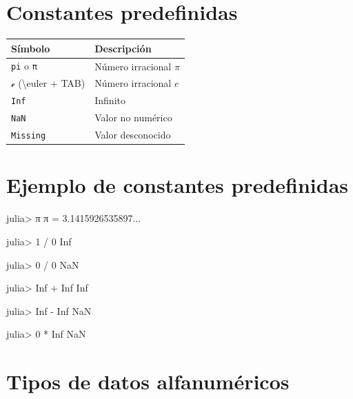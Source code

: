 \documentclass[
  letterpaper,
  DIV=11,
  numbers=noendperiod]{scrreprt}
\newenvironment{Shaded}{\begin{snugshade}}{\end{snugshade}}
\newcommand{\ConstantTok}[1]{\textcolor[rgb]{0.56,0.35,0.01}{#1}}
\newcommand{\FloatTok}[1]{\textcolor[rgb]{0.68,0.00,0.00}{#1}}
\newcommand{\NormalTok}[1]{\textcolor[rgb]{0.00,0.23,0.31}{#1}}
\newcommand{\OperatorTok}[1]{\textcolor[rgb]{0.37,0.37,0.37}{#1}}
\begin{document}
\hypertarget{constantes-predefinidas}{%
\section{Constantes predefinidas}\label{constantes-predefinidas}}

\begin{longtable}[]{@{}ll@{}}
\toprule()
Símbolo & Descripción \\
\midrule()
\endhead
\texttt{pi} o \texttt{π} & Número irracional \(\pi\) \\
\texttt{ℯ} (\textbackslash euler + TAB) & Número irracional \(e\) \\
\texttt{Inf} & Infinito \\
\texttt{NaN} & Valor no numérico \\
\texttt{Missing} & Valor desconocido \\
\bottomrule()
\end{longtable}

\hypertarget{ejemplo-de-constantes-predefinidas}{%
\section{Ejemplo de constantes
predefinidas}\label{ejemplo-de-constantes-predefinidas}}

\begin{Shaded}
\begin{Highlighting}[]
\NormalTok{julia}\OperatorTok{\textgreater{}} \ConstantTok{π}
\ConstantTok{π} \OperatorTok{=} \FloatTok{3.1415926535897}\OperatorTok{...}

\NormalTok{julia}\OperatorTok{\textgreater{}} \FloatTok{1} \OperatorTok{/} \FloatTok{0}
\ConstantTok{Inf}

\NormalTok{julia}\OperatorTok{\textgreater{}} \FloatTok{0} \OperatorTok{/} \FloatTok{0}
\ConstantTok{NaN}

\NormalTok{julia}\OperatorTok{\textgreater{}} \ConstantTok{Inf} \OperatorTok{+} \ConstantTok{Inf}
\ConstantTok{Inf}

\NormalTok{julia}\OperatorTok{\textgreater{}} \ConstantTok{Inf} \OperatorTok{{-}} \ConstantTok{Inf}
\ConstantTok{NaN}

\NormalTok{julia}\OperatorTok{\textgreater{}} \FloatTok{0} \OperatorTok{*} \ConstantTok{Inf}
\ConstantTok{NaN}
\end{Highlighting}
\end{Shaded}

\hypertarget{tipos-de-datos-alfanumuxe9ricos}{%
\section{Tipos de datos
alfanuméricos}\label{tipos-de-datos-alfanumuxe9ricos}}
\end{document}
